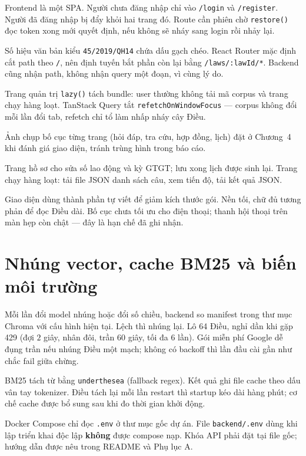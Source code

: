 Frontend là một SPA. Người chưa đăng nhập chỉ vào \texttt{/login} và
\texttt{/register}. Người đã đăng nhập bị đẩy khỏi hai trang đó. Route cần phiên
chờ \texttt{restore()} đọc token xong mới quyết định, nếu không sẽ nháy sang
login rồi nhảy lại.

Số hiệu văn bản kiểu \texttt{45/2019/QH14} chứa dấu gạch chéo. React Router mặc
định cắt path theo \texttt{/}, nên định tuyến bắt phần còn lại bằng
\texttt{/laws/:lawId/*}. Backend cũng nhận path, không nhận query một đoạn, vì
cùng lý do.

Trang quản trị \texttt{lazy()} tách bundle: user thường không tải mã corpus và
trang chạy hàng loạt. TanStack Query tắt \texttt{refetchOnWindowFocus} --- corpus
không đổi mỗi lần đổi tab, refetch chỉ tổ làm nhấp nháy cây Điều.

Ảnh chụp bố cục từng trang (hỏi đáp, tra cứu, hợp đồng, lịch) đặt ở Chương~4 khi
đánh giá giao diện, tránh trùng hình trong báo cáo.

Trang hồ sơ cho sửa số lao động và kỳ GTGT; lưu xong lịch được sinh lại. Trang
chạy hàng loạt: tải file JSON danh sách câu, xem tiến độ, tải kết quả JSON.

Giao diện dùng thành phần tự viết để giảm kích thước gói. Nền tối, chữ đủ tương phản để đọc Điều dài. Bố cục chưa tối ưu cho điện thoại; thanh hội thoại trên màn hẹp còn chật --- đây là hạn chế đã ghi nhận.

\section{Nhúng vector, cache BM25 và biến môi trường}

Mỗi lần đổi model nhúng hoặc đổi số chiều, backend so manifest trong thư mục
Chroma với cấu hình hiện tại. Lệch thì nhúng lại. Lô 64 Điều, nghỉ dần khi gặp
429 (đợi $2$ giây, nhân đôi, trần 60 giây, tối đa 6 lần). Gói miễn phí Google
dễ đụng trần nếu nhúng \soDieu{} Điều một mạch; không có backoff thì lần đầu
cài gần như chắc fail giữa chừng.

BM25 tách từ bằng \texttt{underthesea} (fallback regex). Kết quả ghi file cache
theo dấu vân tay tokenizer. \soDieu{} Điều tách lại mỗi lần restart thì startup
kéo dài hàng phút; cơ chế cache được bổ sung sau khi đo thời gian khởi động.

Docker Compose chỉ đọc \texttt{.env} ở thư mục gốc dự án. File \texttt{backend/.env} dùng khi lập triển khai độc lập \textbf{không} được compose nạp. Khóa API phải đặt tại file gốc; hướng dẫn được nêu trong README và Phụ lục A.

